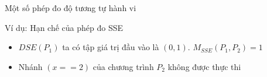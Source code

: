 \begin{frame}{Một số phép đo độ tương tự hành vi}
\begin{exampleblock}{Ví dụ: Hạn chế của phép đo SSE}
	\begin{minipage}[t]{0.45\linewidth}
		
	\end{minipage}%
	\hfill\vrule\hfill
	\begin{minipage}[t]{0.45\linewidth}
		
	\end{minipage}%
	\begin{itemize}
		\item $DSE(P_{1})$ ta có tập giá trị đầu vào là $(0, 1)$.  
		$M_{SSE}(P_{1}, P_{2}) = 1$
		\item Nhánh $ (x == 2) $ của chương trình $ P_{2} $ không được thực thi
	\end{itemize}
\end{exampleblock}
\end{frame}

